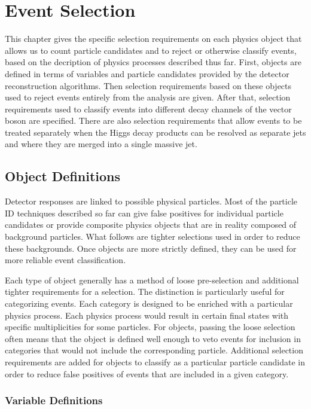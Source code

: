 \chapter{Event Selection} \label{ch:selection}

This chapter gives the specific selection requirements on each physics object
that allows us to count particle candidates and to reject or otherwise classify events,
based on the decription of physics processes described thus far.
First, objects are defined in terms of variables and particle candidates provided by the
detector reconstruction algorithms.
Then selection requirements based on these objects used to reject events entirely
from the analysis are given.
After that, selection requirements used to classify events
into different decay channels of the vector boson are specified.
There are also selection requirements that allow events to be treated separately
when the Higgs decay products can be resolved as separate jets
and where they are merged into a single massive jet.

\section{Object Definitions}

Detector responses are linked to possible physical particles.
Most of the particle ID techniques described so far can give
false positives for individual particle candidates
or provide composite physics objects that are in reality composed of background particles.
What follows are tighter selections used in order to reduce these backgrounds.
Once objects are more strictly defined,
they can be used for more reliable event classification.

Each type of object generally has a method of loose pre-selection
and additional tighter requirements for a selection.
The distinction is particularly useful for categorizing events.
Each category is designed to be enriched with a particular physics process.
Each physics process would result in certain final states
with specific multiplicities for some particles.
For objects, passing the loose selection often means that the object is defined
well enough to veto events for inclusion in categories that
would not include the corresponding particle.
Additional selection requirements are added for objects to classify
as a particular particle candidate in order to reduce false positives
of events that are included in a given category.

\subsection{Variable Definitions}

